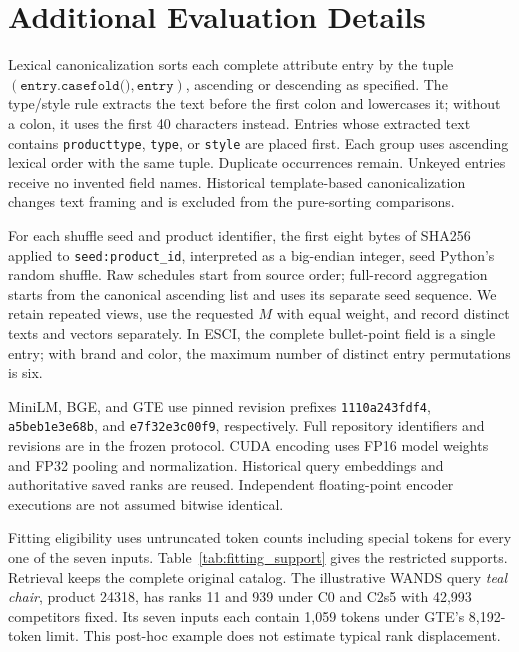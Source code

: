 \section{Additional Evaluation Details}
\label{app:evaluation_details}



Lexical canonicalization sorts each complete attribute entry by the tuple
$(\texttt{entry.casefold()},\texttt{entry})$, ascending or descending as specified.
The type/style rule extracts the text before the first colon and lowercases it;
without a colon, it uses the first 40 characters instead. Entries whose extracted
text contains \texttt{producttype}, \texttt{type}, or \texttt{style} are placed first.
Each group uses ascending lexical order with the same tuple. Duplicate occurrences
remain. Unkeyed entries receive no invented field names. Historical template-based
canonicalization changes text framing and is excluded from the pure-sorting comparisons.

For each shuffle seed and product identifier, the first eight bytes of
SHA256 applied to \texttt{seed:product\_id}, interpreted as a big-endian integer,
seed Python's random shuffle. Raw schedules start from source order; full-record
aggregation starts from the canonical ascending list and uses its separate seed
sequence. We retain repeated views, use the requested $M$ with equal weight, and
record distinct texts and vectors separately. In ESCI, the complete bullet-point
field is a single entry; with brand and color, the maximum number of distinct
entry permutations is six.

MiniLM, BGE, and GTE use pinned revision prefixes
\texttt{1110a243fdf4}, \texttt{a5beb1e3e68b}, and \texttt{e7f32e3c00f9},
respectively. Full repository identifiers and revisions are in the frozen protocol.
CUDA encoding uses FP16 model weights and FP32 pooling and normalization.
Historical query embeddings and authoritative saved ranks are reused.
Independent floating-point encoder executions are not assumed bitwise identical.

Fitting eligibility uses untruncated token counts including special tokens for
every one of the seven inputs. Table~\ref{tab:fitting_support} gives the restricted
supports. Retrieval keeps the complete original catalog. The illustrative
WANDS query \emph{teal chair}, product 24318, has ranks 11 and 939 under C0 and C2s5
with 42,993 competitors fixed. Its seven inputs each contain 1,059 tokens under
GTE's 8,192-token limit. This post-hoc example does not estimate typical rank displacement.

